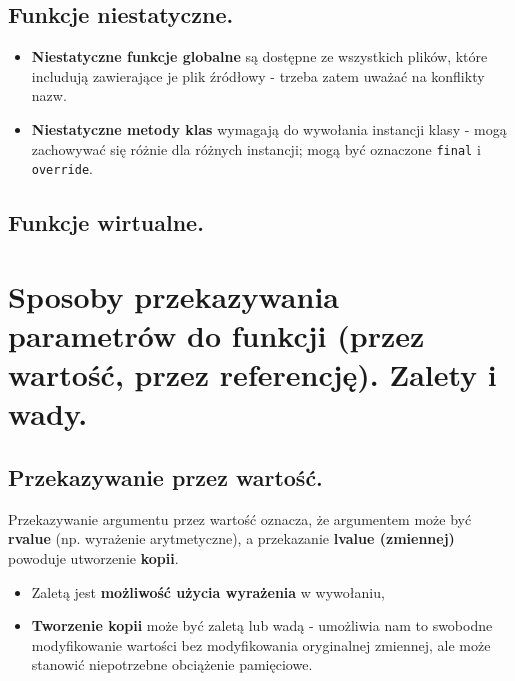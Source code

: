 \documentclass[main.tex]{subfiles}
\begin{document}
    \subsection{Funkcje niestatyczne.}
    \begin{itemize}
        \item \textbf{Niestatyczne funkcje globalne} są dostępne ze wszystkich plików, które includują zawierające
        je plik źródłowy - trzeba zatem uważać na konflikty nazw.
        \item \textbf{Niestatyczne metody klas} wymagają do wywołania instancji klasy - mogą zachowywać się różnie
        dla różnych instancji; mogą być oznaczone \texttt{final} i \texttt{override}.
    \end{itemize}

    \subsection{Funkcje wirtualne.}


    \section{Sposoby przekazywania parametrów do funkcji (przez wartość, przez referencję). Zalety i wady.}

    \subsection{Przekazywanie przez wartość.}

    Przekazywanie argumentu przez wartość oznacza, że argumentem może być \textbf{rvalue} (np. wyrażenie arytmetyczne), a przekazanie
    \textbf{lvalue (zmiennej)} powoduje utworzenie \textbf{kopii}.
    \begin{itemize}
        \item Zaletą jest \textbf{możliwość użycia wyrażenia} w wywołaniu,
        \item \textbf{Tworzenie kopii} może być zaletą lub wadą - umożliwia nam to swobodne modyfikowanie wartości
        bez modyfikowania oryginalnej zmiennej, ale może stanowić niepotrzebne obciążenie pamięciowe.
    \end{itemize}
\end{document}
